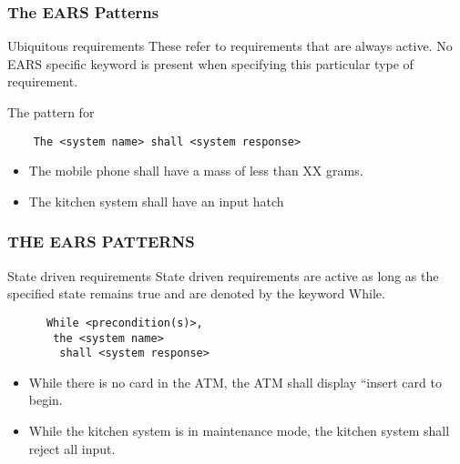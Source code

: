 \documentclass[aspectratio=169]{beamer}
\begin{document}
\begin{frame}[fragile]
  \frametitle{The EARS Patterns}
  \begin{block}{Ubiquitous requirements}
    These refer to requirements that are always active. No EARS specific keyword is present when specifying this particular type of requirement.
    
    The pattern for 
    \begin{verbatim}
    The <system name> shall <system response>  
    \end{verbatim}
  \end{block}
  \begin{example}
    \begin{itemize}
      \item The mobile phone shall have a mass of less than XX grams.
      \item The kitchen system shall have an input hatch
    \end{itemize}
  \end{example}
\end{frame}


\begin{frame}[fragile]
  \frametitle{THE EARS PATTERNS}
  \begin{block}{State driven requirements}
  State driven requirements are active as long as the specified state remains true and are denoted by the keyword While.
    \begin{verbatim}
      While <precondition(s)>, 
       the <system name> 
        shall <system response>
    \end{verbatim}  
  \end{block}
  
  \begin{example}
  \begin{itemize}
    \item While there is no card in the ATM, the ATM shall display “insert card to begin.
    \item While the kitchen system is in maintenance mode, the kitchen system shall reject all input.
  \end{itemize}
  \end{example}

\end{frame}
\end{document}
